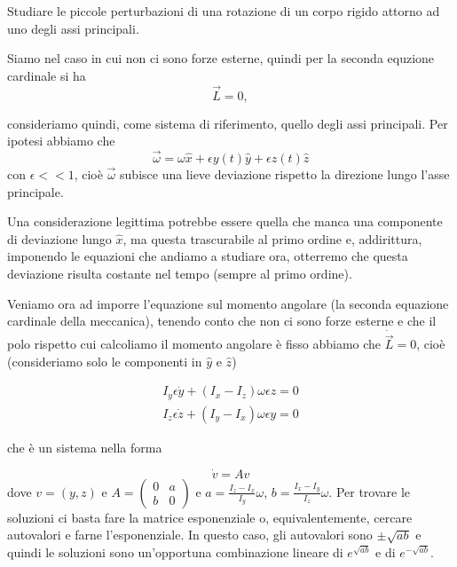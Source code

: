 \documentclass[../main.tex]{subfiles}
\begin{document}

\textex
 Studiare le piccole perturbazioni di una rotazione di un corpo rigido attorno ad uno degli assi principali.

\solution
 Siamo nel caso in cui non ci sono forze esterne, quindi per la seconda equzione cardinale si ha
 \begin{equation}
	\label{pap:cardinale}
	\vec{L} = 0,
 \end{equation}
 
 consideriamo quindi, come sistema di riferimento, quello degli assi principali. Per ipotesi abbiamo che
 \begin{equation}
	\vec{\omega} = \omega \hat{x} + \epsilon y(t)\hat y + \epsilon z(t) \hat z
 \end{equation}
 con $\epsilon<< 1$, cioè $\vec{\omega}$ subisce una lieve deviazione rispetto la direzione lungo l'asse principale.
 
 Una considerazione legittima potrebbe essere quella che manca una componente di deviazione lungo $\hat x$, ma questa trascurabile al primo ordine e,
 addirittura, imponendo le equazioni che andiamo a studiare ora, otterremo che questa deviazione risulta costante nel tempo (sempre al primo ordine).
 
 Veniamo ora ad imporre l'equazione sul momento angolare (la seconda equazione cardinale della meccanica), tenendo conto che non ci sono forze 
 esterne e che il polo rispetto cui calcoliamo il momento angolare è fisso abbiamo che $\dot{\vec{L}}=0$, cioè
 (consideriamo solo le componenti in $\hat y$ e $\hat z$)
 
 \begin{align}
	I_y \epsilon\dot y + (I_x-I_z)\omega \epsilon z = 0 \\
	I_z \epsilon\dot z + (I_y-I_x)\omega \epsilon y = 0
 \end{align}
 
 che è un sistema nella forma
 
 \[
	\dot v = A v
 \]
 dove $v=(y,z)$ e $A=\left(\begin{smallmatrix} 0 & a \\ b & 0 \end{smallmatrix} \right)$ e $a = \frac{I_z-I_x}{I_y}\omega$,
 $b=\frac{I_x-I_y}{I_z}\omega$. Per trovare le soluzioni ci basta fare la matrice esponenziale o, equivalentemente, 
 cercare autovalori e farne l'esponenziale.
 In questo caso, gli autovalori sono $\pm \sqrt{ab}$ e quindi le soluzioni sono un'opportuna combinazione lineare di 
 $e^{\sqrt{ab}}$ e di $e^{-\sqrt{ab}}$.
 
\end{document}
